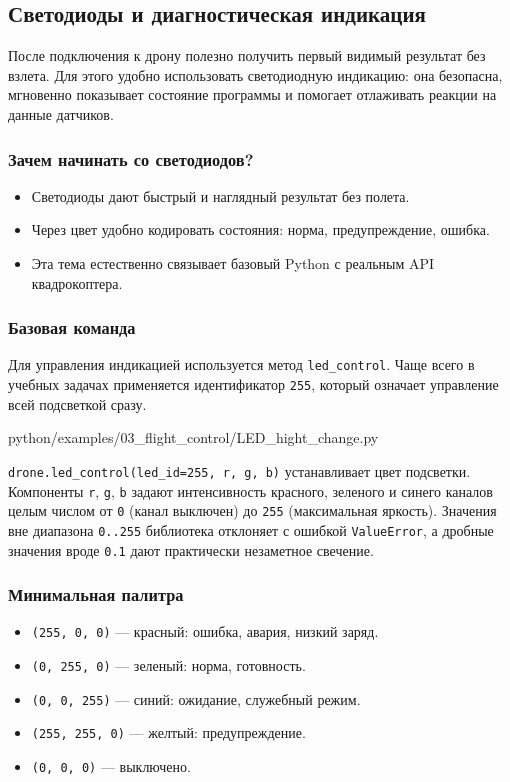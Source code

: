 \subsection{Светодиоды и диагностическая индикация}
 
После подключения к дрону полезно получить первый видимый результат без взлета. Для этого удобно использовать светодиодную индикацию: она безопасна, мгновенно показывает состояние программы и помогает отлаживать реакции на данные датчиков.
 
\subsubsection*{Зачем начинать со светодиодов?}
\begin{itemize}
    \item Светодиоды дают быстрый и наглядный результат без полета.
    \item Через цвет удобно кодировать состояния: норма, предупреждение, ошибка.
    \item Эта тема естественно связывает базовый Python с реальным API квадрокоптера.
\end{itemize}
 
\subsubsection*{Базовая команда}
Для управления индикацией используется метод \texttt{led\_control}. Чаще всего в учебных задачах применяется идентификатор \texttt{255}, который означает управление всей подсветкой сразу.
 
\begin{codefile}[python]{python/examples/03_flight_control/LED_hight_change.py}
\end{codefile}
 
\begin{infobox}
\texttt{drone.led\_control(led\_id=255, r, g, b)} устанавливает цвет подсветки. Компоненты \texttt{r}, \texttt{g}, \texttt{b} задают интенсивность красного, зеленого и синего каналов целым числом от \texttt{0} (канал выключен) до \texttt{255} (максимальная яркость). Значения вне диапазона \texttt{0..255} библиотека отклоняет с ошибкой \texttt{ValueError}, а дробные значения вроде \texttt{0.1} дают практически незаметное свечение.
\end{infobox}
 
\subsubsection*{Минимальная палитра}
\begin{itemize}
    \item \texttt{(255, 0, 0)} --- красный: ошибка, авария, низкий заряд.
    \item \texttt{(0, 255, 0)} --- зеленый: норма, готовность.
    \item \texttt{(0, 0, 255)} --- синий: ожидание, служебный режим.
    \item \texttt{(255, 255, 0)} --- желтый: предупреждение.
    \item \texttt{(0, 0, 0)} --- выключено.
\end{itemize}
 
